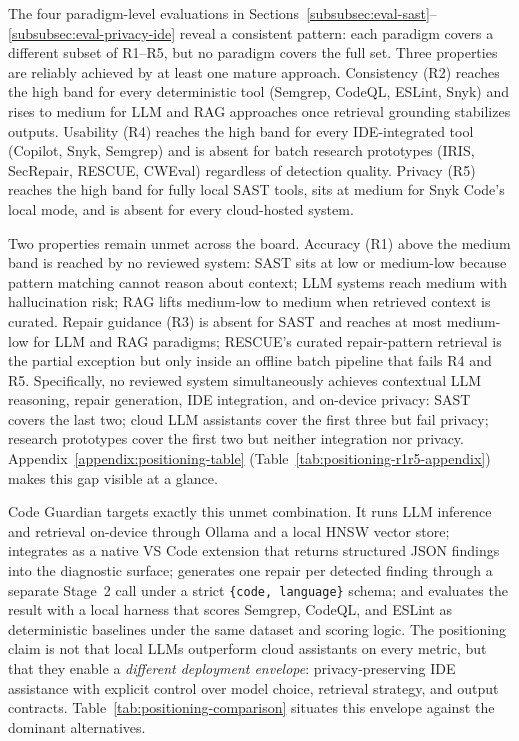 The four paradigm-level evaluations in Sections~\ref{subsubsec:eval-sast}--\ref{subsubsec:eval-privacy-ide} reveal a consistent pattern: each paradigm covers a different subset of R1--R5, but no paradigm covers the full set. Three properties are reliably achieved by at least one mature approach. Consistency (R2) reaches the high band for every deterministic tool (Semgrep, CodeQL, ESLint, Snyk) and rises to medium for LLM and RAG approaches once retrieval grounding stabilizes outputs. Usability (R4) reaches the high band for every IDE-integrated tool (Copilot, Snyk, Semgrep) and is absent for batch research prototypes (IRIS, SecRepair, RESCUE, CWEval) regardless of detection quality. Privacy (R5) reaches the high band for fully local SAST tools, sits at medium for Snyk Code's local mode, and is absent for every cloud-hosted system.

Two properties remain unmet across the board. Accuracy (R1) above the medium band is reached by no reviewed system: SAST sits at low or medium-low because pattern matching cannot reason about context; LLM systems reach medium with hallucination risk; RAG lifts medium-low to medium when retrieved context is curated. Repair guidance (R3) is absent for SAST and reaches at most medium-low for LLM and RAG paradigms; RESCUE's curated repair-pattern retrieval is the partial exception but only inside an offline batch pipeline that fails R4 and R5. Specifically, no reviewed system simultaneously achieves contextual LLM reasoning, repair generation, IDE integration, and on-device privacy: SAST covers the last two; cloud LLM assistants cover the first three but fail privacy; research prototypes cover the first two but neither integration nor privacy. Appendix~\ref{appendix:positioning-table} (Table~\ref{tab:positioning-r1r5-appendix}) makes this gap visible at a glance.

Code Guardian targets exactly this unmet combination. It runs LLM inference and retrieval on-device through Ollama and a local HNSW vector store; integrates as a native VS Code extension that returns structured JSON findings into the diagnostic surface; generates one repair per detected finding through a separate Stage~2 call under a strict \texttt{\{code, language\}} schema; and evaluates the result with a local harness that scores Semgrep, CodeQL, and ESLint as deterministic baselines under the same dataset and scoring logic. The positioning claim is not that local LLMs outperform cloud assistants on every metric, but that they enable a \emph{different deployment envelope}: privacy-preserving IDE assistance with explicit control over model choice, retrieval strategy, and output contracts. Table~\ref{tab:positioning-comparison} situates this envelope against the dominant alternatives.

